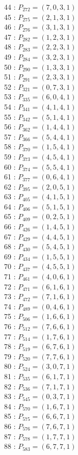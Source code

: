 \documentclass{article}
\begin{document}
{\begin{multicols}{3}
44 : $P_{272}=( 7, 0, 3, 1 )$\\
45 : $P_{275}=( 2, 1, 3, 1 )$\\
46 : $P_{276}=( 3, 1, 3, 1 )$\\
47 : $P_{282}=( 1, 2, 3, 1 )$\\
48 : $P_{283}=( 2, 2, 3, 1 )$\\
49 : $P_{284}=( 3, 2, 3, 1 )$\\
50 : $P_{290}=( 1, 3, 3, 1 )$\\
51 : $P_{291}=( 2, 3, 3, 1 )$\\
52 : $P_{321}=( 0, 7, 3, 1 )$\\
53 : $P_{335}=( 6, 0, 4, 1 )$\\
54 : $P_{341}=( 4, 1, 4, 1 )$\\
55 : $P_{342}=( 5, 1, 4, 1 )$\\
56 : $P_{362}=( 1, 4, 4, 1 )$\\
57 : $P_{366}=( 5, 4, 4, 1 )$\\
58 : $P_{370}=( 1, 5, 4, 1 )$\\
59 : $P_{373}=( 4, 5, 4, 1 )$\\
60 : $P_{374}=( 5, 5, 4, 1 )$\\
61 : $P_{377}=( 0, 6, 4, 1 )$\\
62 : $P_{395}=( 2, 0, 5, 1 )$\\
63 : $P_{405}=( 4, 1, 5, 1 )$\\
64 : $P_{406}=( 5, 1, 5, 1 )$\\
65 : $P_{409}=( 0, 2, 5, 1 )$\\
66 : $P_{426}=( 1, 4, 5, 1 )$\\
67 : $P_{429}=( 4, 4, 5, 1 )$\\
68 : $P_{430}=( 5, 4, 5, 1 )$\\
69 : $P_{434}=( 1, 5, 5, 1 )$\\
70 : $P_{437}=( 4, 5, 5, 1 )$\\
71 : $P_{461}=( 4, 0, 6, 1 )$\\
72 : $P_{471}=( 6, 1, 6, 1 )$\\
73 : $P_{472}=( 7, 1, 6, 1 )$\\
74 : $P_{489}=( 0, 4, 6, 1 )$\\
75 : $P_{506}=( 1, 6, 6, 1 )$\\
76 : $P_{512}=( 7, 6, 6, 1 )$\\
77 : $P_{514}=( 1, 7, 6, 1 )$\\
78 : $P_{519}=( 6, 7, 6, 1 )$\\
79 : $P_{520}=( 7, 7, 6, 1 )$\\
80 : $P_{524}=( 3, 0, 7, 1 )$\\
81 : $P_{535}=( 6, 1, 7, 1 )$\\
82 : $P_{536}=( 7, 1, 7, 1 )$\\
83 : $P_{545}=( 0, 3, 7, 1 )$\\
84 : $P_{570}=( 1, 6, 7, 1 )$\\
85 : $P_{575}=( 6, 6, 7, 1 )$\\
86 : $P_{576}=( 7, 6, 7, 1 )$\\
87 : $P_{578}=( 1, 7, 7, 1 )$\\
88 : $P_{583}=( 6, 7, 7, 1 )$\\
\end{multicols}


}
\end{document}
